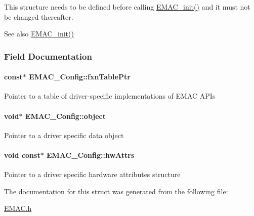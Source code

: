 This structure needs to be defined before calling \hyperlink{_e_m_a_c_8h_a48ca15f3164b615bacbe55d60c54a79d}{E\+M\+A\+C\+\_\+init()} and it must not be changed thereafter.

\begin{DoxySeeAlso}{See also}
\hyperlink{_e_m_a_c_8h_a48ca15f3164b615bacbe55d60c54a79d}{E\+M\+A\+C\+\_\+init()} 
\end{DoxySeeAlso}


\subsubsection{Field Documentation}
\paragraph[{fxn\+Table\+Ptr}]{ const$\ast$ E\+M\+A\+C\+\_\+\+Config\+::fxn\+Table\+Ptr}\label{struct_e_m_a_c___config_ab185f772142dc7bcc7276b910f3fc15a}
Pointer to a table of driver-\/specific implementations of E\+M\+A\+C A\+P\+Is 
\paragraph[{object}]{\setlength{\rightskip}{0pt plus 5cm}void$\ast$ E\+M\+A\+C\+\_\+\+Config\+::object}\label{struct_e_m_a_c___config_a8eb24eaa3ce2d86c33bca0762856ec0a}
Pointer to a driver specific data object 
\paragraph[{hw\+Attrs}]{\setlength{\rightskip}{0pt plus 5cm}void const$\ast$ E\+M\+A\+C\+\_\+\+Config\+::hw\+Attrs}\label{struct_e_m_a_c___config_a540dbb956eb8a63c306cd913709e9536}
Pointer to a driver specific hardware attributes structure 

The documentation for this struct was generated from the following file\+:\begin{DoxyCompactItemize}
\item 
\hyperlink{_e_m_a_c_8h}{E\+M\+A\+C.\+h}\end{DoxyCompactItemize}
